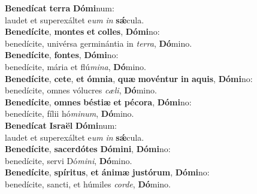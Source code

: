 \evenverse \textbf{Be}\textbf{ne}\textbf{dí}\textbf{cat} \textbf{ter}\textbf{ra} \textbf{Dó}\textbf{mi}num:~\*\\
\evenverse laudet et superexáltet e\textit{um} \textit{in} \textbf{sǽ}cula.\\
\oddverse \textbf{Be}\textbf{ne}\textbf{dí}\textbf{ci}\textbf{te}, \textbf{mon}\textbf{tes} \textbf{et} \textbf{col}\textbf{les}, \textbf{Dó}\textbf{mi}no:~\*\\
\oddverse benedícite, univérsa germinántia in \textit{ter}\textit{ra}, \textbf{Dó}mino.\\
\evenverse \textbf{Be}\textbf{ne}\textbf{dí}\textbf{ci}\textbf{te}, \textbf{fon}\textbf{tes}, \textbf{Dó}\textbf{mi}no:~\*\\
\evenverse benedícite, mária et flú\textit{mi}\textit{na}, \textbf{Dó}mino.\\
\oddverse \textbf{Be}\textbf{ne}\textbf{dí}\textbf{ci}\textbf{te}, \textbf{ce}\textbf{te}, \textbf{et} \textbf{óm}\textbf{ni}\textbf{a}, \textbf{quæ} \textbf{mo}\textbf{vén}\textbf{tur} \textbf{in} \textbf{a}\textbf{quis}, \textbf{Dó}\textbf{mi}no:~\*\\
\oddverse benedícite, omnes vólucres \textit{cæ}\textit{li}, \textbf{Dó}mino.\\
\evenverse \textbf{Be}\textbf{ne}\textbf{dí}\textbf{ci}\textbf{te}, \textbf{om}\textbf{nes} \textbf{bé}\textbf{sti}\textbf{æ} \textbf{et} \textbf{pé}\textbf{co}\textbf{ra}, \textbf{Dó}\textbf{mi}no:~\*\\
\evenverse benedícite, fílii hó\textit{mi}\textit{num}, \textbf{Dó}mino.\\
\oddverse \textbf{Be}\textbf{ne}\textbf{dí}\textbf{cat} \textbf{Is}\textbf{ra}\textbf{ël} \textbf{Dó}\textbf{mi}num:~\*\\
\oddverse laudet et superexáltet e\textit{um} \textit{in} \textbf{sǽ}cula.\\
\evenverse \textbf{Be}\textbf{ne}\textbf{dí}\textbf{ci}\textbf{te}, \textbf{sa}\textbf{cer}\textbf{dó}\textbf{tes} \textbf{Dó}\textbf{mi}\textbf{ni}, \textbf{Dó}\textbf{mi}no:~\*\\
\evenverse benedícite, servi Dó\textit{mi}\textit{ni}, \textbf{Dó}mino.\\
\oddverse \textbf{Be}\textbf{ne}\textbf{dí}\textbf{ci}\textbf{te}, \textbf{spí}\textbf{ri}\textbf{tus}, \textbf{et} \textbf{á}\textbf{ni}\textbf{mæ} \textbf{ju}\textbf{stó}\textbf{rum}, \textbf{Dó}\textbf{mi}no:~\*\\
\oddverse benedícite, sancti, et húmiles \textit{cor}\textit{de}, \textbf{Dó}mino.\\

